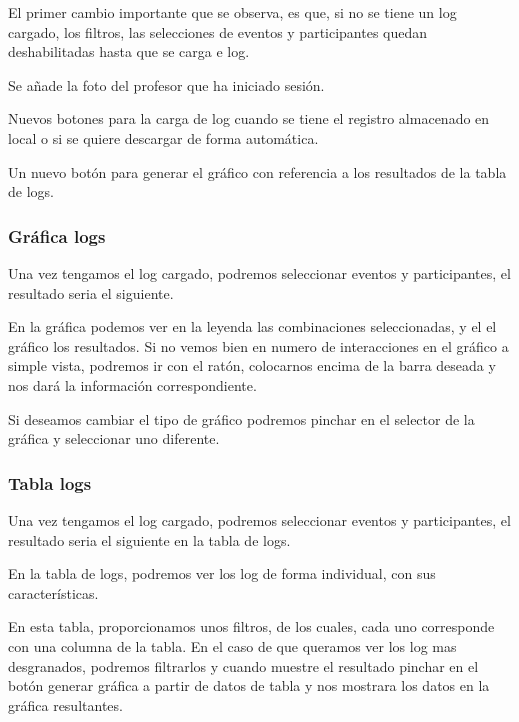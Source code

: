 El primer cambio importante que se observa, es que, si no se tiene un log cargado, los filtros, las selecciones de eventos y participantes quedan deshabilitadas hasta que se carga e log.

Se añade la foto del profesor que ha iniciado sesión.

Nuevos botones para la carga de log cuando se tiene el registro almacenado en local o si se quiere descargar de forma automática.

Un nuevo botón para generar el gráfico con referencia a los resultados de la tabla de logs.

\subsubsection{Gráfica logs}\label{grafica-logs}

Una vez tengamos el log cargado, podremos seleccionar eventos y participantes, el resultado seria el siguiente.


En la gráfica podemos ver en la leyenda las combinaciones seleccionadas, y el el gráfico los resultados. Si no vemos bien en numero de interacciones en el gráfico a simple vista, podremos ir con el ratón, colocarnos encima de la barra deseada y nos dará la información correspondiente.

Si deseamos cambiar el tipo de gráfico podremos pinchar en el selector de la gráfica y seleccionar uno diferente.

\subsubsection{Tabla logs}\label{tabla-logs}

Una vez tengamos el log cargado, podremos seleccionar eventos y participantes, el resultado seria el siguiente en la tabla de logs.


En la tabla de logs, podremos ver los log de forma individual, con sus características.

En esta tabla, proporcionamos unos filtros, de los cuales, cada uno corresponde con una columna de la tabla. En el caso de que queramos ver los log mas desgranados, podremos filtrarlos y cuando muestre el resultado pinchar en el botón generar gráfica a partir de datos de tabla y nos mostrara los datos en la gráfica resultantes.



















